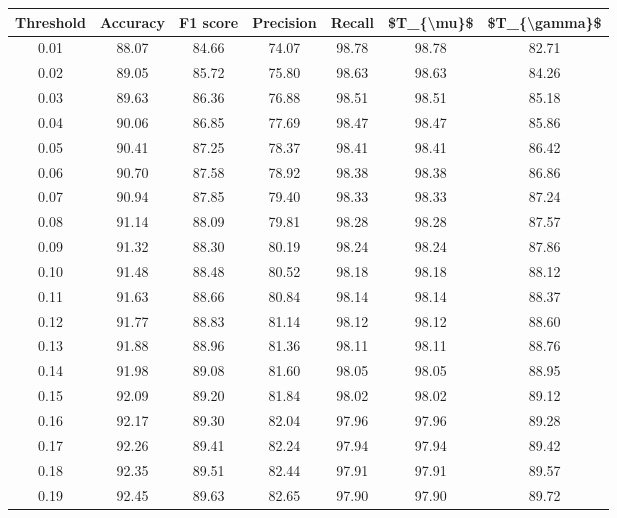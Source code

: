 \begin{tabular}{|c|c|c|c|c|c|c|}
\hline
 Threshold &  Accuracy &  F1 score &  Precision &  Recall &  \$T\_\{\textbackslash mu\}\$ &  \$T\_\{\textbackslash gamma\}\$ \\
\hline
      0.01 &     88.07 &     84.66 &      74.07 &   98.78 &      98.78 &         82.71 \\
      0.02 &     89.05 &     85.72 &      75.80 &   98.63 &      98.63 &         84.26 \\
      0.03 &     89.63 &     86.36 &      76.88 &   98.51 &      98.51 &         85.18 \\
      0.04 &     90.06 &     86.85 &      77.69 &   98.47 &      98.47 &         85.86 \\
      0.05 &     90.41 &     87.25 &      78.37 &   98.41 &      98.41 &         86.42 \\
      0.06 &     90.70 &     87.58 &      78.92 &   98.38 &      98.38 &         86.86 \\
      0.07 &     90.94 &     87.85 &      79.40 &   98.33 &      98.33 &         87.24 \\
      0.08 &     91.14 &     88.09 &      79.81 &   98.28 &      98.28 &         87.57 \\
      0.09 &     91.32 &     88.30 &      80.19 &   98.24 &      98.24 &         87.86 \\
      0.10 &     91.48 &     88.48 &      80.52 &   98.18 &      98.18 &         88.12 \\
      0.11 &     91.63 &     88.66 &      80.84 &   98.14 &      98.14 &         88.37 \\
      0.12 &     91.77 &     88.83 &      81.14 &   98.12 &      98.12 &         88.60 \\
      0.13 &     91.88 &     88.96 &      81.36 &   98.11 &      98.11 &         88.76 \\
      0.14 &     91.98 &     89.08 &      81.60 &   98.05 &      98.05 &         88.95 \\
      0.15 &     92.09 &     89.20 &      81.84 &   98.02 &      98.02 &         89.12 \\
      0.16 &     92.17 &     89.30 &      82.04 &   97.96 &      97.96 &         89.28 \\
      0.17 &     92.26 &     89.41 &      82.24 &   97.94 &      97.94 &         89.42 \\
      0.18 &     92.35 &     89.51 &      82.44 &   97.91 &      97.91 &         89.57 \\
      0.19 &     92.45 &     89.63 &      82.65 &   97.90 &      97.90 &         89.72 \\

\end{tabular}
